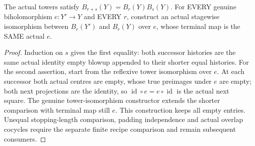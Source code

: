 \begin{theorem}
\label{hir:sharp-actual-identity-empty-padding-comparison}
\leanok
The actual towers satisfy $B_{r+s}(Y)=B_r(Y)B_s(Y)$.
For EVERY genuine biholomorphism $e:Y'\to Y$ and EVERY $r$, construct an
actual stagewise isomorphism between $B_r(Y')$ and $B_r(Y)$ over $e$,
whose terminal map is the SAME actual $e$.
\end{theorem}
\begin{proof}
Induction on $s$ gives the first equality: both successor histories are
the same actual identity empty blowup appended to their shorter equal
histories. For the second assertion, start from the reflexive tower
isomorphism over $e$. At each successor both actual centres are empty,
whose true preimages under $e$ are empty; both next projections are the
identity, so $\operatorname{id}\circ e=e\circ\operatorname{id}$ is the
actual next square. The genuine tower-isomorphism constructor extends
the shorter comparison with terminal map still $e$. This construction
keeps all empty entries. Unequal stopping-length comparison, padding
independence and actual overlap cocycles require the separate finite
recipe comparison and remain subsequent consumers.
\end{proof}
